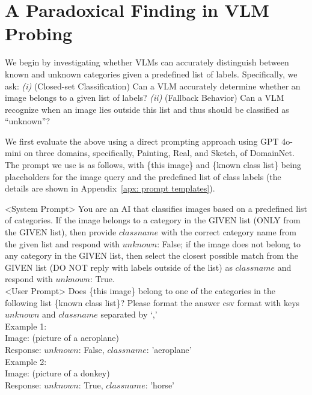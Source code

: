 \documentclass[10pt]{article} %
\begin{document}
\section{A Paradoxical Finding in VLM Probing} 
\label{sec:preliminaries}

We begin by investigating whether VLMs can accurately distinguish between known and unknown categories given a predefined list of labels.
Specifically, we ask: {\em(i)} (Closed-set Classification) Can a VLM accurately determine whether an image belongs to a given list of labels? {\em(ii)} (Fallback Behavior) Can a VLM recognize when an image lies outside this list and thus should be classified as ``unknown''?

%
%
We first evaluate the above using a direct prompting approach using GPT 4o-mini on three domains, specifically, Painting, Real, and Sketch, of DomainNet.
The prompt we use is as follows, with \{this image\} and \{known class list\} being placeholders for the image query and the predefined list of class labels (the details are shown in Appendix~\ref{apx: prompt templates}).

\begin{promptquote}
<System Prompt> You are an AI that classifies images based on a predefined list of categories. 
If the image belongs to a category in the GIVEN list (ONLY from the GIVEN list), 
then provide $classname$ with the correct category name from the given list 
and respond with $unknown$: False; 
if the image does not belong to any category in the GIVEN list, 
then select the closest possible match from the GIVEN list 
(DO NOT reply with labels outside of the list) 
as $classname$ and respond with $unknown$: True.\\

<User Prompt> Does \{this image\} belong to one of the categories in the following list \{known class list\}? Please format the answer csv format with keys $unknown$ and $class name$ separated by `,' \\
Example 1:\\
Image: (picture of a aeroplane)\\
Response: $unknown$: False, $class name$: 'aeroplane'\\
Example 2:\\
Image: (picture of a donkey)\\
Response: $unknown$: True, $class name$: 'horse'
\end{promptquote}
\end{document}
